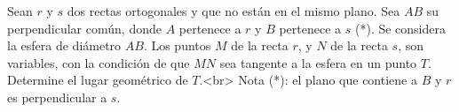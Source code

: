 Sean $r$ y $s$ dos rectas ortogonales y que no están en el mismo plano.
Sea $AB$ su perpendicular común, donde $A$ pertenece a $r$ y $B$ pertenece a $s$ (*).
Se considera la esfera de diámetro $AB$. Los puntos $M$ de la recta $r$, y $N$ de la recta $s$, son variables, con la condición de que $MN$ sea tangente a la esfera en un punto $T$.
Determine el lugar geométrico de $T$.<br>
Nota (*): el plano que contiene a $B$ y $r$ es perpendicular a $s$. 